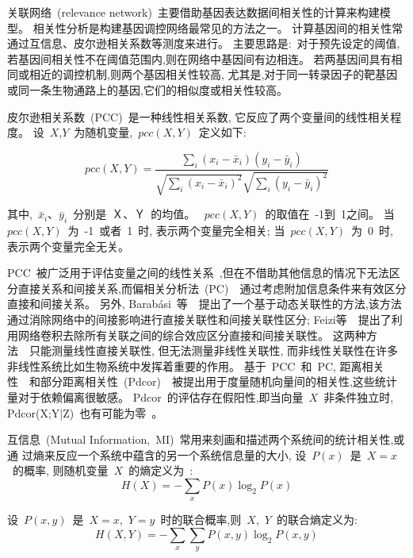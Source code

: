 关联网络~(relevance network)~主要借助基因表达数据间相关性的计算来构建模型。
相关性分析是构建基因调控网络最常见的方法之一。
计算基因间的相关性常通过互信息、皮尔逊相关系数等测度来进行。
主要思路是:~对于预先设定的阈值,若基因间相关性不在阈值范围内,则在网络中基因间有边相连。
若两基因间具有相同或相近的调控机制,则两个基因相关性较高,
尤其是,对于同一转录因子的靶基因或同一条生物通路上的基因,它们的相似度或相关性较高。

皮尔逊相关系数~(PCC)~是一种线性相关系数, 它反应了两个变量间的线性相关程度。
设~$X$,$Y$~为随机变量,~$pcc(X,Y)$~定义如下:

\begin{equation}
pcc(X,Y) = \frac{{\sum\limits_i {(x_i -\bar x_i )(y_i -\bar y_i )} }}{{\sqrt {\sum\limits_i {(x_i  - \bar x_i )^2 } } \sqrt {\sum\limits_i {(y_i  - \bar y_i )^2 } } }}
\end{equation}

其中,~$\bar x_i$、$\bar y_i$~分别是~Ｘ、Ｙ~的均值。
~$pcc(X,Y)$~的取值在~-1到~1之间。
当~$pcc(X,Y)$~为~-1~或者~1~时, 表示两个变量完全相关;
当~$pcc(X,Y)$~为~0~时, 表示两个变量完全无关。

PCC~被广泛用于评估变量之间的线性关系~\cite{stuart2003gene},但在不借助其他信息的情况下无法区分直接关系和间接关系,而偏相关分析法~(PC)~\cite{baba2004partial}~通过考虑附加信息条件来有效区分直接和间接关系。
另外, Barabási~等~\cite{barzel2013network}~提出了一个基于动态关联性的方法,该方法通过消除网络中的间接影响进行直接关联性和间接关联性区分; 
Feizi等~\cite{feizi2013network}~提出了利用网络卷积去除所有关联之间的综合效应区分直接和间接关联性。
这两种方法~\cite{barzel2013network,feizi2013network}~只能测量线性直接关联性,
但无法测量非线性关联性, 而非线性关联性在许多非线性系统比如生物系统中发挥着重要的作用。
基于~PCC~和~PC, 距离相关性~\cite{szekely2007measuring,kosorok2009brownian}~和部分距离相关性~(Pdcor)~\cite{szekely2014partial}~被提出用于度量随机向量间的相关性,这些统计量对于依赖偏离很敏感。
Pdcor~的评估存在假阳性,即当向量~$X$~非条件独立时, Pdcor(X;Y|Z)~也有可能为零~\cite{szekely2014partial}。

互信息~(Mutual Information,~MI)~常用来刻画和描述两个系统间的统计相关性,或通
过熵来反应一个系统中蕴含的另一个系统信息量的大小, 设~$P(x)$~是~$X=x$~的概率,
则随机变量~$X$~的熵定义为~\cite{cover2012elements}:
\begin{equation}
H(X) = - \sum\limits_x {P(x)\log _2 P(x)} 
\end{equation}

设~$P(x,y)$~是~$X=x$,~$Y=y$~时的联合概率,则~$X$,~$Y$~的联合熵定义为:
\begin{equation}
H(X,Y) =  - \sum\limits_x {\sum\limits_y {P(x,y)\log _2 P(x,y)} } 
\end{equation}

